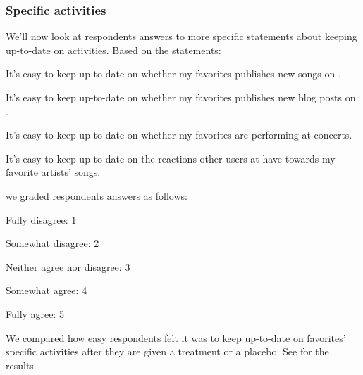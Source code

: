 \subsubsection{Specific activities}

We'll now look at respondents answers to more specific statements about
keeping up-to-date on activities.
Based on the statements:
\begin{items}
  \item It's easy to keep up-to-date on whether my favorites publishes
    new songs on \urort{}.
  \item It's easy to keep up-to-date on whether my favorites publishes
    new blog posts on \urort{}.
  \item It's easy to keep up-to-date on whether my favorites are
    performing at concerts.
  \item It's easy to keep up-to-date on the reactions other users at
    \urort{} have towards my favorite artists' songs.
\end{items}

we graded respondents answers as follows:

\begin{items}
  \item Fully disagree: 1
  \item Somewhat disagree: 2
  \item Neither agree nor disagree: 3
  \item Somewhat agree: 4
  \item Fully agree: 5
\end{items}

We compared how easy respondents felt it was to keep up-to-date on
favorites' specific activities after they are given a treatment
or a placebo.
See
 for the results.

